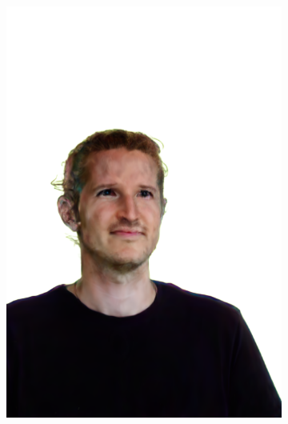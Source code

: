 \begin{figure}[ht]
\begin{subfigure}{0.08\linewidth}
        \includegraphics[width=\textwidth]{Figures/results/low/ephra_rabbit/11_render.png}

\end{subfigure}
\end{figure}
